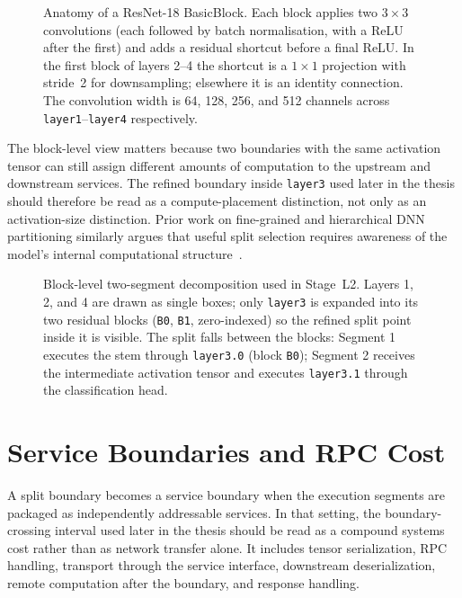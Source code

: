 \begin{figure}[htbp]
\centering
%
\caption[Anatomy of a ResNet-18 BasicBlock]{Anatomy of a ResNet-18 BasicBlock. Each block applies two $3{\times}3$ convolutions (each followed by batch normalisation, with a ReLU after the first) and adds a residual shortcut before a final ReLU. In the first block of layers 2--4 the shortcut is a $1{\times}1$ projection with stride~2 for downsampling; elsewhere it is an identity connection. The convolution width is 64, 128, 256, and 512 channels across \texttt{layer1}--\texttt{layer4} respectively.}
\label{fig:basicblock_anatomy}
\end{figure}

The block-level view matters because two boundaries with the same activation tensor can
still assign different amounts of computation to the upstream and downstream services.
The refined boundary inside \texttt{layer3} used later in the thesis should therefore
be read as a compute-placement distinction, not only as an activation-size
distinction. Prior work on fine-grained and hierarchical DNN partitioning similarly
argues that useful split selection requires awareness of the model's internal
computational structure~\cite{fine_grained_partitioning,hierarchical_partitioning,pareto_split}.

\begin{figure}[htbp]
\centering
%
\caption[Block-level two-segment decomposition (Stage~L2)]{Block-level two-segment decomposition used in Stage~L2. Layers 1, 2, and 4 are drawn as single boxes; only \texttt{layer3} is expanded into its two residual blocks (\texttt{B0}, \texttt{B1}, zero-indexed) so the refined split point inside it is visible. The split falls between the blocks: Segment 1 executes the stem through \texttt{layer3.0} (block \texttt{B0}); Segment 2 receives the intermediate activation tensor and executes \texttt{layer3.1} through the classification head.}
\label{fig:rq12_split_after_layer3_block0_segments}
\end{figure}

\section{Service Boundaries and RPC Cost}
\label{sec:bg-service-boundaries}

A split boundary becomes a service boundary when the execution segments are packaged
as independently addressable services. In that setting, the boundary-crossing interval
used later in the thesis should be read as a compound systems cost rather than as
network transfer alone. It includes tensor serialization, RPC handling, transport
through the service interface, downstream deserialization, remote computation after the
boundary, and response handling.

